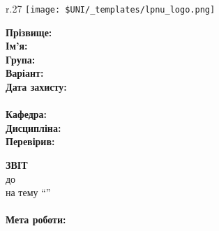 \Margins
\begin{wrapfigure}[3]{r}{.27\textwidth}
\texttt{[image: \$UNI/\_templates/lpnu\_logo.png]}
\end{wrapfigure}

\noindent\textbf{Прізвище:} \Lname \\
\noindent\textbf{Ім'я:} \Fname \\
\noindent\textbf{Група:} \Group \\
\noindent\textbf{Варіант:} \Variant \\
\noindent\textbf{Дата захисту:} \Date \\
\\
\noindent\textbf{Кафедра:} \Department \\
\noindent\textbf{Дисципліна:} \Discipline \\
\noindent\textbf{Перевірив:} \Instructor \\


\begin{center}
	\textbf{ЗВІТ}		\\
	до \Type~\No\Number	\\
	на тему ``\Topic''	\\
\end{center}
\paragraph{Мета роботи:}
